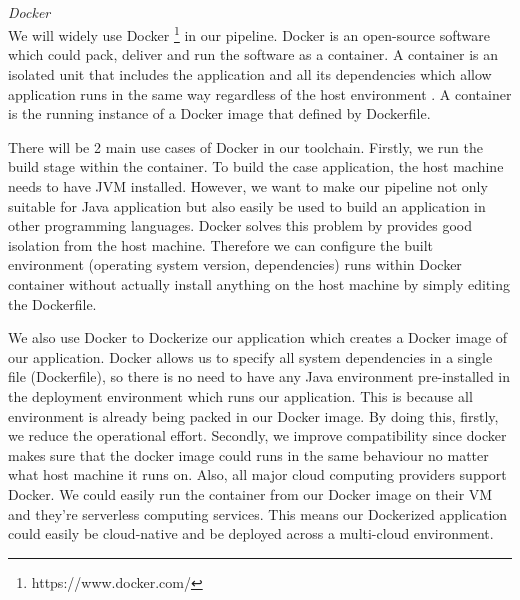 \medskip
\\
\textit{Docker}\\
We will widely use Docker \footnote{https://www.docker.com/} in our pipeline.  Docker is an open-source software which could pack, deliver and run the software as a container. A container is an isolated unit that includes the application and all its dependencies which allow application runs in the same way regardless of the host environment \cite{WhatisaC60:online}. A container is the running instance of a Docker image that defined by Dockerfile.
\par    
\label{docker}
There will be 2 main use cases of Docker in our toolchain. Firstly, we run the build stage within the container. To build the case application, the host machine needs to have JVM installed. However, we want to make our pipeline not only suitable for Java application but also easily be used to build an application in other programming languages. Docker solves this problem by provides good isolation from the host machine. Therefore we can configure the built environment (operating system version, dependencies) runs within Docker container  without actually install anything on the host machine by simply editing the Dockerfile.
\par
We also use Docker to Dockerize our application which creates a Docker image of our application.
Docker allows us to specify all system dependencies in a single file (Dockerfile), so there is no need to have any Java environment pre-installed in the deployment environment which runs our application. This is because all environment is already being packed in our Docker image. By doing this, firstly, we reduce the operational effort. Secondly, we improve compatibility since docker makes sure that the docker image could runs in the same behaviour no matter what host machine it runs on. Also, all major cloud computing providers support Docker. We could easily run the container from our Docker image on their VM and they're serverless computing services. This means our Dockerized application could easily be cloud-native and be deployed across a multi-cloud environment.
